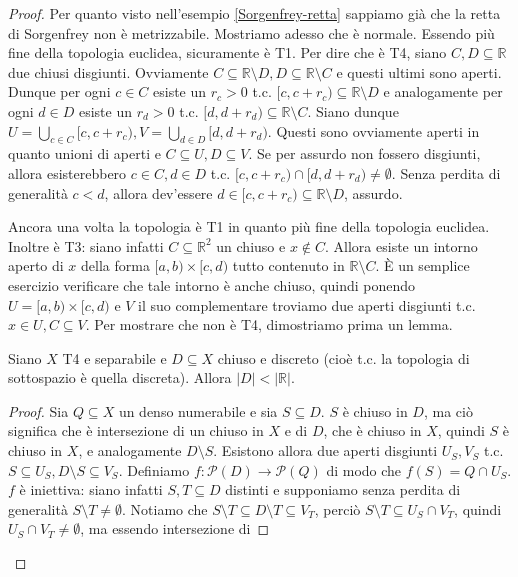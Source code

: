 \begin{proof}
  Per quanto visto nell'esempio \ref{Sorgenfrey-retta} sappiamo già che la retta di Sorgenfrey non è metrizzabile. Mostriamo adesso che è normale. Essendo più fine della topologia euclidea, sicuramente è T1. Per dire che è T4, siano $C, D \subseteq \mathbb{R}$ due chiusi disgiunti. Ovviamente $C \subseteq \mathbb{R} \setminus D, D \subseteq \mathbb{R} \setminus C$ e questi ultimi sono aperti. Dunque per ogni $c \in C$ esiste un  $r_c>0$ t.c. $[c, c+r_c) \subseteq \mathbb{R} \setminus D$ e analogamente per ogni
  $d \in D$ esiste un $r_d>0$ t.c. $[d, d+r_d) \subseteq \mathbb{R} \setminus C$. Siano dunque $\displaystyle U =\bigcup_{c \in C} [c, c+r_c), V=\bigcup_{d \in D} [d, d+r_d)$. Questi sono ovviamente aperti in quanto unioni di aperti e $C \subseteq U, D \subseteq V$. Se per assurdo non fossero disgiunti, allora esisterebbero $c \in C, d \in D$ t.c. $[c, c+r_c) \cap [d, d+r_d) \not= \emptyset$. Senza perdita di generalità $c<d$, allora dev'essere
  $d \in [c, c+r_c) \subseteq \mathbb{R} \setminus D$, assurdo.
  \item Ancora una volta la topologia è T1 in quanto più fine della topologia euclidea. Inoltre è T3: siano infatti $C \subseteq \mathbb{R}^2$ un chiuso e $x \not \in C$. Allora esiste un intorno aperto di $x$ della forma $[a, b) \times [c, d)$ tutto contenuto in $\mathbb{R} \setminus C$. È un semplice esercizio verificare che tale intorno è anche chiuso, quindi ponendo $U=[a, b) \times [c, d)$ e $V$ il suo complementare troviamo due aperti disgiunti t.c. $x \in U, C \subseteq V$.
  Per mostrare che non è T4, dimostriamo prima un lemma.
  \begin{lm}
    Siano $X$ T4 e separabile e $D \subseteq X$ chiuso e discreto (cioè t.c. la topologia di sottospazio è quella discreta). Allora $|D| < |\mathbb{R}|$.
  \end{lm}
  \begin{proof}
    Sia $Q \subseteq X$ un denso numerabile e sia $S \subseteq D$. $S$ è chiuso in $D$, ma ciò significa che è intersezione di un chiuso in $X$ e di $D$, che è chiuso in $X$, quindi $S$ è chiuso in $X$, e analogamente $D \setminus S$. Esistono allora due aperti disgiunti $U_S, V_S$ t.c. $S \subseteq U_S, D \setminus S \subseteq V_S$. Definiamo $f: \mathcal{P}(D) \rightarrow \mathcal{P}(Q)$ di modo che $f(S)=Q \cap U_S$. $f$ è iniettiva:
    siano infatti $S, T \subseteq D$ distinti e supponiamo senza perdita di generalità $S \setminus T \not= \emptyset$. Notiamo che $S \setminus T \subseteq D \setminus T \subseteq V_T$, perciò $S \setminus T \subseteq U_S \cap V_T$, quindi $U_S \cap V_T \not= \emptyset$, ma essendo intersezione di

\end{proof}
\end{proof}
